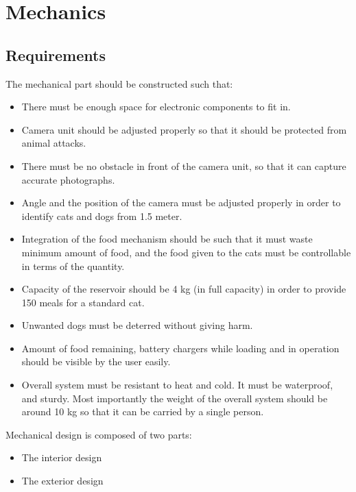 \section{Mechanics} \label{sec:mech}

\subsection{Requirements}

The mechanical part should be constructed such that:
\begin{itemize}
    \item There must be enough space for electronic components to fit in.
    \item Camera unit should be adjusted properly so that it should be protected from animal attacks.
    \item There must be no obstacle in front of the camera unit, so that it can capture accurate photographs.
    \item Angle and the position of the camera must be adjusted properly in order to identify cats and dogs from 1.5 meter.
    \item Integration of the food mechanism should be such that it must waste minimum amount of food, and the food given to the cats must be controllable in terms of the quantity.
    \item Capacity of the reservoir should be 4 kg (in full capacity) in order to provide 150 meals for a standard cat.
    \item Unwanted dogs must be deterred without giving harm.
    \item Amount of food remaining, battery chargers while loading and in operation should be visible by the user easily.
    \item Overall system must be resistant to heat and cold. It must be waterproof, and sturdy. Most importantly the weight of the overall system should be around 10 kg so that it can be carried by a single person.
\end{itemize}

Mechanical design is composed of two parts: 
\begin{itemize}
    \item The interior design
    \item The exterior design
\end{itemize}

